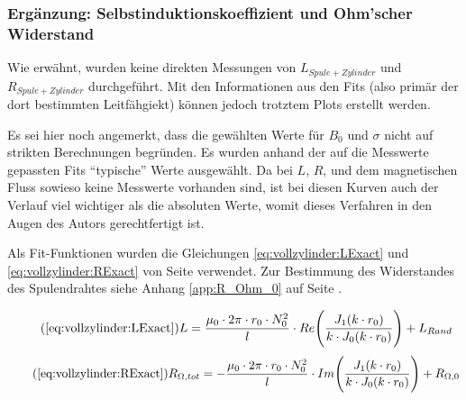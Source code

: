 {    \subsubsection{Erg\"anzung: Selbstinduktionskoeffizient und Ohm'scher Widerstand}
    \label{sec:ausw:subsec:vollz:subsubsec:LR}

	\begin{minipage}[t]{0.33\textwidth}
        \vspace{0mm}
        Wie  erw\"ahnt,  wurden  keine  direkten  Messungen  von  $L_{Spule  +
        Zylinder}$   und  $R_{Spule   +  Zylinder}$   durchgef\"uhrt. Mit  den
        Informationen  aus  den  Fits   (also  prim\"ar  der  dort  bestimmten
        Leitf\"ahgiekt) k\"onnen jedoch trotztem Plots erstellt werden.

        Es sei  hier noch  angemerkt, dass die  gew\"ahlten Werte  f\"ur $B_0$
        und $\sigma$  nicht auf  strikten Berechnungen  begr\"unden. Es wurden
        anhand  der  auf  die  Messwerte  gepassten  Fits  ``typische''  Werte
        ausgew\"ahlt. Da  bei $L$,  $R$,  und dem  magnetischen Fluss  sowieso
        keine Messwerte vorhanden sind, ist bei diesen Kurven auch der Verlauf
        viel wichtiger als die absoluten  Werte, womit dieses Verfahren in den
        Augen des Autors gerechtfertigt ist.

        Als        Fit-Funktionen         wurden        die        Gleichungen
        \ref{eq:vollzylinder:LExact}   und  \ref{eq:vollzylinder:RExact}   von
        Seite  \pageref{eq:vollzylinder:LExact} verwendet. Zur  Bestimmung des
        Widerstandes  des  Spulendrahtes  siehe Anhang  \ref{app:R_Ohm_0}  auf
        Seite \pageref{app:R_Ohm_0}.

        \begin{equation}
            \tag{\ref{eq:vollzylinder:LExact}}
            L = \frac{\mu_0 \cdot 2\pi \cdot r_0 \cdot N_0^2}{l} \cdot Re \Biggl(\frac{J_1 (k \cdot r_0)}{k \cdot J_0 (k \cdot r_0)} \Biggr) + L_{Rand}
        \end{equation}
        \begin{equation}
            \tag{\ref{eq:vollzylinder:RExact}}
            R_{\Omega,tot} = - \frac{\mu_0 \cdot 2\pi \cdot r_0 \cdot N_0^2}{l} \cdot Im \Biggl(\frac{J_1 (k \cdot r_0)}{k \cdot J_0 (k \cdot r_0)} \Biggr) + R_{\Omega,0}
        \end{equation}


\end{minipage}}

